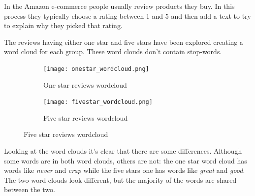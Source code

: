 In the Amazon e-commerce people usually review products they buy. In this process they typically choose a rating between 1 and 5 and then add a text to try to explain why they picked that rating.

The reviews having either one star and five stars have been explored creating a word cloud for each group. These word clouds don't contain stop-words.
\begin{figure}[h]
    \center
    \begin{subfigure}{0.49\textwidth}
    \texttt{[image: onestar\_wordcloud.png]}
    \caption{One star reviews wordcloud}
    \label{5*cloud}
    \end{subfigure}
    \begin{subfigure}{0.49\textwidth}
    \texttt{[image: fivestar\_wordcloud.png]}
    \caption{Five star reviews wordcloud}
    \label{1*cloud}
    \end{subfigure}
\end{figure}

Looking at the word clouds it's clear that there are some differences. Although some words are in both word clouds, others are not: the one star word cloud has words like \textit{never} and \textit{crap} while the five stars one has words like \textit{great} and \textit{good}. The two word clouds look different, but the majority of the words are shared between the two.

